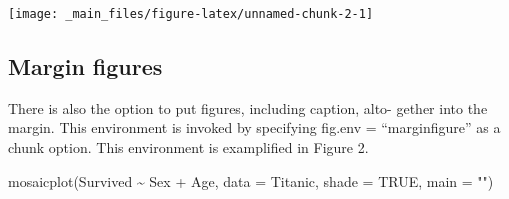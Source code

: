\documentclass[%
numbers=noendperiod,
parskip=half,
bibliography=totoc,
,
]{scrartcl}
\newenvironment{Shaded}{\begin{snugshade}}{\end{snugshade}}
\newcommand{\AttributeTok}[1]{\textcolor[rgb]{0.77,0.63,0.00}{#1}}
\newcommand{\ConstantTok}[1]{\textcolor[rgb]{0.00,0.00,0.00}{#1}}
\newcommand{\ControlFlowTok}[1]{\textcolor[rgb]{0.13,0.29,0.53}{\textbf{#1}}}
\newcommand{\DecValTok}[1]{\textcolor[rgb]{0.00,0.00,0.81}{#1}}
\newcommand{\FloatTok}[1]{\textcolor[rgb]{0.00,0.00,0.81}{#1}}
\newcommand{\FunctionTok}[1]{\textcolor[rgb]{0.00,0.00,0.00}{#1}}
\newcommand{\NormalTok}[1]{#1}
\newcommand{\OtherTok}[1]{\textcolor[rgb]{0.56,0.35,0.01}{#1}}
\newcommand{\SpecialCharTok}[1]{\textcolor[rgb]{0.00,0.00,0.00}{#1}}
\newcommand{\StringTok}[1]{\textcolor[rgb]{0.31,0.60,0.02}{#1}}
\begin{document}
\begin{Shaded}
\end{Shaded}

\texttt{[image: \_main\_files/figure-latex/unnamed-chunk-2-1]}

\hypertarget{margin-figures}{%
\subsection{Margin figures}\label{margin-figures}}

There is also the option to put figures, including caption, alto- gether into the margin.
This environment is invoked by specifying fig.env = ``marginfigure'' as a chunk option.
This environment is examplified in Figure 2.

\begin{Shaded}
\begin{Highlighting}[]
 \FunctionTok{mosaicplot}\NormalTok{(Survived }\SpecialCharTok{\textasciitilde{}}\NormalTok{ Sex }\SpecialCharTok{+}\NormalTok{ Age, }\AttributeTok{data =}\NormalTok{ Titanic, }\AttributeTok{shade =} \ConstantTok{TRUE}\NormalTok{, }\AttributeTok{main =} \StringTok{""}\NormalTok{)}
\end{Highlighting}
\end{Shaded}
\end{document}
